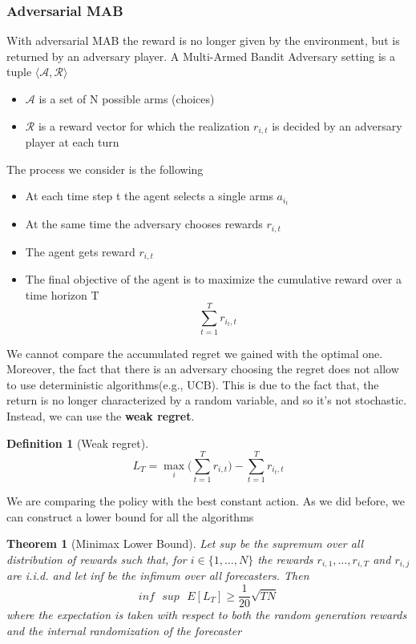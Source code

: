 \documentclass[main.tex]{subfiles}
\newtheorem{theorem}{Theorem}[section]
\newtheorem{definition}{Definition}[section]
\begin{document}
\subsubsection{Adversarial MAB}
With adversarial MAB the reward is no longer given by the environment, but is returned by an adversary player. A Multi-Armed Bandit Adversary setting is a tuple $\langle \mathcal{A}, \mathcal{R} \rangle$
\begin{itemize}
    \item $\mathcal{A}$ is a set of N possible arms (choices)
    \item $\mathcal{R}$ is a reward vector for which the realization $r_{i,t}$ is decided by an adversary player at each turn
\end{itemize}
The process we consider is the following
\begin{itemize}
    \item At each time step t the agent selects a single arms $a_{i_t}$
    \item At the same time the adversary chooses rewards $r_{i,t}$
    \item The agent gets reward $r_{i,t}$
    \item The final objective of the agent is to maximize the cumulative reward over a time horizon T
          \begin{equation*}
              \sum_{t=1}^T r_{i_t,t}
          \end{equation*}
\end{itemize}
We cannot compare the accumulated regret we gained with the optimal one. Moreover, the fact that there is an adversary choosing the regret does not allow to use deterministic algorithms(e.g., UCB). This is due to the fact that, the return is no longer characterized by a random variable, and so it's not stochastic. Instead, we can use the \textbf{weak regret}.
\begin{definition}[Weak regret]
    \begin{equation*}
        L_T = \max_i \bigg( \sum_{t=1}^T r_{i,t} \bigg) - \sum_{t=1}^T r_{i_t,t}
    \end{equation*}
\end{definition}
We are comparing the policy with the best constant action.
As we did before, we can construct a lower bound for all the algorithms
\begin{theorem}[Minimax Lower Bound]
    Let sup be the supremum over all distribution of rewards such that, for $i \in \{ 1, \dots, N \}$ the rewards $r_{i,1}, \dots, r_{i,T}$ and $r_{i,j}$ are i.i.d. and let inf be the infimum over all forecasters. Then
    \begin{equation*}
        inf\text{ }sup\text{ }E[L_T] \geq \frac{1}{20}\sqrt{TN}
    \end{equation*}
    where the expectation is taken with respect to both the random generation rewards and the internal randomization of the forecaster
\end{theorem}
\end{document}
